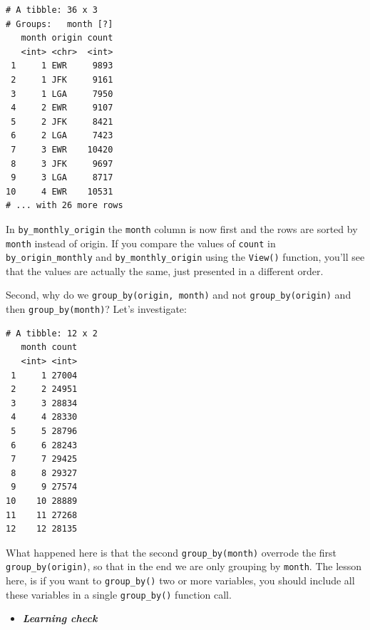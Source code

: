 \documentclass[12pt,]{krantz}
\makeatletter
\newenvironment{Shaded}{\begin{snugshade}}{\end{snugshade}}
\newcommand{\KeywordTok}[1]{\textcolor[rgb]{0.27,0.27,0.27}{\textbf{#1}}}
\newcommand{\DataTypeTok}[1]{\textcolor[rgb]{0.27,0.27,0.27}{#1}}
\newcommand{\StringTok}[1]{\textcolor[rgb]{0.5,0.5,0.5}{#1}}
\newcommand{\OperatorTok}[1]{\textcolor[rgb]{0.43,0.43,0.43}{\textbf{#1}}}
\newcommand{\NormalTok}[1]{#1}
\newenvironment{kframe}{%
\medskip{}
\setlength{\fboxsep}{.8em}
 \def\at@end@of@kframe{}%
 \ifinner\ifhmode%
  \def\at@end@of@kframe{\end{minipage}}%
  \begin{minipage}{\columnwidth}%
 \fi\fi%
 \def\FrameCommand##1{\hskip\@totalleftmargin \hskip-\fboxsep
 \colorbox{shadecolor}{##1}\hskip-\fboxsep
     \hskip-\linewidth \hskip-\@totalleftmargin \hskip\columnwidth}%
 \MakeFramed {\advance\hsize-\width
   \@totalleftmargin\z@ \linewidth\hsize
   \@setminipage}}%
 {\par\unskip\endMakeFramed%
 \at@end@of@kframe}
\renewenvironment{Shaded}{\begin{kframe}}{\end{kframe}}
\newenvironment{rmdblock}[1]
  {\begin{shaded*}
  \begin{itemize}
  \renewcommand{\labelitemi}{
    \raisebox{-.7\height}[0pt][0pt]{
    }
  }
  \item
  }
  {
  \end{itemize}
  \end{shaded*}
  }
\newenvironment{learncheck}
  {\begin{rmdblock}{warning}}
  {\end{rmdblock}}
\theoremstyle{definition}
\theoremstyle{definition}
\theoremstyle{definition}
\theoremstyle{remark}
\makeatother
\begin{document}
\begin{verbatim}
# A tibble: 36 x 3
# Groups:   month [?]
   month origin count
   <int> <chr>  <int>
 1     1 EWR     9893
 2     1 JFK     9161
 3     1 LGA     7950
 4     2 EWR     9107
 5     2 JFK     8421
 6     2 LGA     7423
 7     3 EWR    10420
 8     3 JFK     9697
 9     3 LGA     8717
10     4 EWR    10531
# ... with 26 more rows
\end{verbatim}

In \texttt{by\_monthly\_origin} the \texttt{month} column is now first
and the rows are sorted by \texttt{month} instead of origin. If you
compare the values of \texttt{count} in \texttt{by\_origin\_monthly} and
\texttt{by\_monthly\_origin} using the \texttt{View()} function, you'll
see that the values are actually the same, just presented in a different
order.

Second, why do we \texttt{group\_by(origin,\ month)} and not
\texttt{group\_by(origin)} and then \texttt{group\_by(month)}? Let's
investigate:

\begin{Shaded}
\end{Shaded}

\begin{verbatim}
# A tibble: 12 x 2
   month count
   <int> <int>
 1     1 27004
 2     2 24951
 3     3 28834
 4     4 28330
 5     5 28796
 6     6 28243
 7     7 29425
 8     8 29327
 9     9 27574
10    10 28889
11    11 27268
12    12 28135
\end{verbatim}

What happened here is that the second \texttt{group\_by(month)} overrode
the first \texttt{group\_by(origin)}, so that in the end we are only
grouping by \texttt{month}. The lesson here, is if you want to
\texttt{group\_by()} two or more variables, you should include all these
variables in a single \texttt{group\_by()} function call.

\begin{learncheck}
\textbf{\emph{Learning check}}
\end{learncheck}
\end{document}
